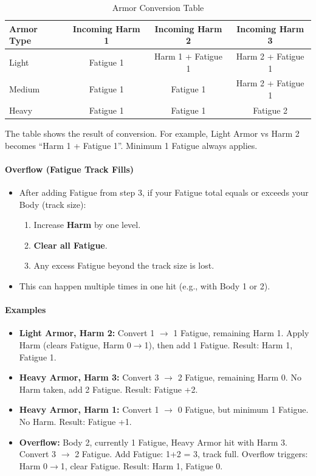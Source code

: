 \begin{table}[h]
\centering
\caption{Armor Conversion Table}
\begin{tabular}{lccc}
\toprule
\textbf{Armor Type} & \textbf{Incoming Harm 1} & \textbf{Incoming Harm 2} & \textbf{Incoming Harm 3} \\
\midrule
Light  & Fatigue 1             & Harm 1 + Fatigue 1    & Harm 2 + Fatigue 1 \\
Medium & Fatigue 1             & Fatigue 1             & Harm 2 + Fatigue 1 \\
Heavy  & Fatigue 1             & Fatigue 1             & Fatigue 2 \\
\bottomrule
\end{tabular}
\end{table}
\noindent The table shows the result of conversion. For example, Light Armor vs Harm 2 becomes “Harm 1 + Fatigue 1”. Minimum 1 Fatigue always applies.

\paragraph{Overflow (Fatigue Track Fills)}
\begin{itemize}[leftmargin=*]
  \item After adding Fatigue from step 3, if your Fatigue total equals or exceeds your Body (track size):
  \begin{enumerate}[nosep]
    \item Increase \textbf{Harm} by one level.
    \item \textbf{Clear all Fatigue}.
    \item Any excess Fatigue beyond the track size is lost.
  \end{enumerate}
  \item This can happen multiple times in one hit (e.g., with Body 1 or 2).
\end{itemize}

\paragraph{Examples}
\begin{itemize}[leftmargin=*]
  \item \textbf{Light Armor, Harm 2:} Convert 1 $\to$ 1 Fatigue, remaining Harm 1. Apply Harm (clears Fatigue, Harm 0$\to$1), then add 1 Fatigue. Result: Harm 1, Fatigue 1.
  \item \textbf{Heavy Armor, Harm 3:} Convert 3 $\to$ 2 Fatigue, remaining Harm 0. No Harm taken, add 2 Fatigue. Result: Fatigue +2.
  \item \textbf{Heavy Armor, Harm 1:} Convert 1 $\to$ 0 Fatigue, but minimum 1 Fatigue. No Harm. Result: Fatigue +1.
  \item \textbf{Overflow:} Body 2, currently 1 Fatigue, Heavy Armor hit with Harm 3. Convert 3 $\to$ 2 Fatigue. Add Fatigue: 1+2 = 3, track full. Overflow triggers: Harm 0$\to$1, clear Fatigue. Result: Harm 1, Fatigue 0.
\end{itemize}

